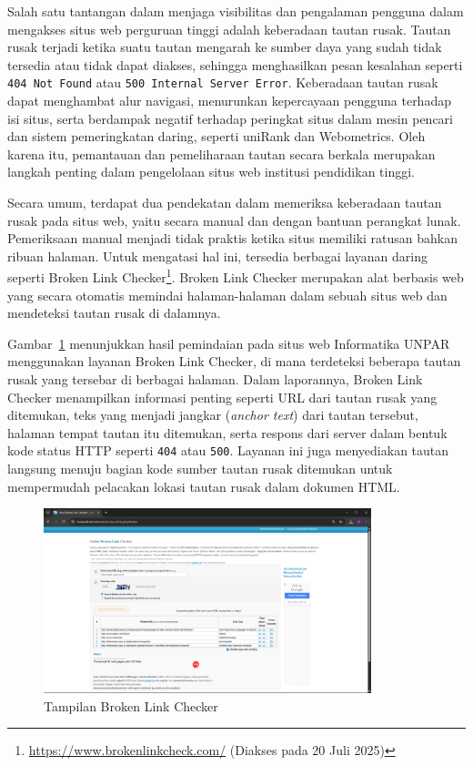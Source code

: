 \documentclass[a4paper,twoside]{article}
\begin{document}
Salah satu tantangan dalam menjaga visibilitas dan pengalaman pengguna dalam mengakses situs web perguruan tinggi adalah keberadaan tautan rusak. Tautan rusak terjadi ketika suatu tautan mengarah ke sumber daya yang sudah tidak tersedia atau tidak dapat diakses, sehingga menghasilkan pesan kesalahan seperti \texttt{404 Not Found} atau \texttt{500 Internal Server Error}. Keberadaan tautan rusak dapat menghambat alur navigasi, menurunkan kepercayaan pengguna terhadap isi situs, serta berdampak negatif terhadap peringkat situs dalam mesin pencari dan sistem pemeringkatan daring, seperti uniRank dan Webometrics. Oleh karena itu, pemantauan dan pemeliharaan tautan secara berkala merupakan langkah penting dalam pengelolaan situs web institusi pendidikan tinggi.


Secara umum, terdapat dua pendekatan dalam memeriksa keberadaan tautan rusak pada situs web, yaitu secara manual dan dengan bantuan perangkat lunak. Pemeriksaan manual menjadi tidak praktis ketika situs memiliki ratusan bahkan ribuan halaman. Untuk mengatasi hal ini, tersedia berbagai layanan daring seperti Broken Link Checker\footnote{\url{https://www.brokenlinkcheck.com/} (Diakses pada 20 Juli 2025)}. Broken Link Checker merupakan alat berbasis web yang secara otomatis memindai halaman-halaman dalam sebuah situs web dan mendeteksi tautan rusak di dalamnya.

Gambar~\ref{fig:gambar-contoh-brokenlinkcheck} menunjukkan hasil pemindaian pada situs web Informatika UNPAR menggunakan layanan Broken Link Checker, di mana terdeteksi beberapa tautan rusak yang tersebar di berbagai halaman. Dalam laporannya, Broken Link Checker menampilkan informasi penting seperti URL dari tautan rusak yang ditemukan, teks yang menjadi jangkar (\textit{anchor text}) dari tautan tersebut, halaman tempat tautan itu ditemukan, serta respons dari server dalam bentuk kode status HTTP seperti \texttt{404} atau \texttt{500}. Layanan ini juga menyediakan tautan langsung menuju bagian kode sumber tautan rusak ditemukan untuk mempermudah pelacakan lokasi tautan rusak dalam dokumen HTML.

\begin{figure}[H]
    \centering
    \includegraphics[width=0.85\textwidth]{broken-link-checker.png}
    \caption{Tampilan Broken Link Checker}
    \label{fig:gambar-contoh-brokenlinkcheck}
\end{figure}
\end{document}
